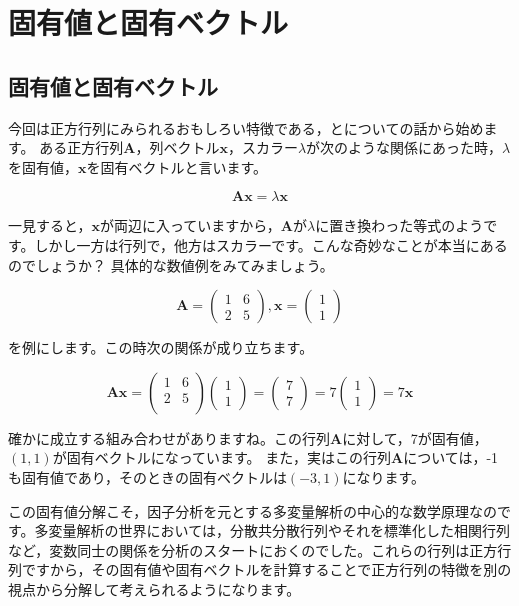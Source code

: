 \documentclass{ltjsbook}
\begin{document}
\chapter{固有値と固有ベクトル}
\label{L07_Eigen}
\section{固有値と固有ベクトル}
今回は正方行列にみられるおもしろい特徴である，とについての話から始めます。
ある正方行列$\bm{A}$，列ベクトル$\bm{x}$，スカラー$\lambda$が次のような関係にあった時，$\lambda$を固有値，$\bm{x}$を固有ベクトルと言います。

\[ \bm{Ax} = \lambda\bm{x} \]

一見すると，$\bm{x}$が両辺に入っていますから，$\bm{A}$が$\lambda$に置き換わった等式のようです。しかし一方は行列で，他方はスカラーです。こんな奇妙なことが本当にあるのでしょうか？
具体的な数値例をみてみましょう。

\[
	\bm{A} = \begin{pmatrix}
		1 & 6 \\ 2 & 5
	\end{pmatrix}
	,\bm{x} = \begin{pmatrix}
		1 \\ 1
	\end{pmatrix}
\]

を例にします。この時次の関係が成り立ちます。

\[
	\bm{Ax} =
	\begin {pmatrix}
	1 & 6 \\
	2 & 5 \\
	\end{pmatrix}
	\begin{pmatrix}
		1 \\ 1
	\end{pmatrix}
	=
	\begin{pmatrix}
		7 \\ 7
	\end{pmatrix}
	=7
	\begin{pmatrix}
		1 \\ 1
	\end{pmatrix}
	=7 \bm{x}
\]

確かに成立する組み合わせがありますね。この行列$\bm{A}$に対して，7が固有値，$(1,1)$が固有ベクトルになっています。
また，実はこの行列$\bm{A}$については，-1も固有値であり，そのときの固有ベクトルは$(-3,1)$になります。

この固有値分解こそ，因子分析を元とする多変量解析の中心的な数学原理なのです。多変量解析の世界においては，分散共分散行列やそれを標準化した相関行列など，変数同士の関係を分析のスタートにおくのでした。これらの行列は正方行列ですから，その固有値や固有ベクトルを計算することで正方行列の特徴を別の視点から分解して考えられるようになります。
\end{document}
